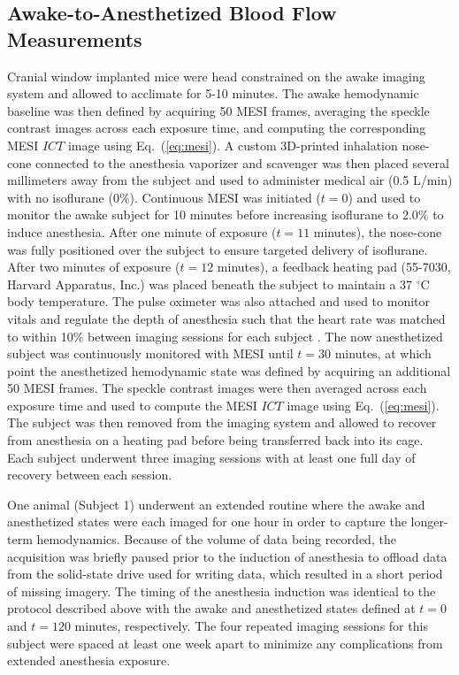 \documentclass[review]{elsarticle}
\begin{document}

\subsection{Awake-to-Anesthetized Blood Flow Measurements}

Cranial window implanted mice were head constrained on the awake imaging system and allowed to acclimate for 5-10 minutes. The awake hemodynamic baseline was then defined by acquiring 50 MESI frames, averaging the speckle contrast images across each exposure time, and computing the corresponding MESI $ICT$ image using Eq.~(\ref{eq:mesi}). A custom 3D-printed inhalation nose-cone connected to the anesthesia vaporizer and scavenger was then placed several millimeters away from the subject and used to administer medical air (0.5 L/min) with no isoflurane (0\%). Continuous MESI was initiated ($t = 0$) and used to monitor the awake subject for 10 minutes before increasing isoflurane to 2.0\% to induce anesthesia. After one minute of exposure ($t = 11$ minutes), the nose-cone was fully positioned over the subject to ensure targeted delivery of isoflurane. After two minutes of exposure ($t = 12$ minutes), a feedback heating pad (55-7030, Harvard Apparatus, Inc.) was placed beneath the subject to maintain a 37 $^\circ$C body temperature. The pulse oximeter was also attached and used to monitor vitals and regulate the depth of anesthesia such that the heart rate was matched to within 10\% between imaging sessions for each subject \cite{Kazmi:2013hp}. The now anesthetized subject was continuously monitored with MESI until $t = 30$ minutes, at which point the anesthetized hemodynamic state was defined by acquiring an additional 50 MESI frames. The speckle contrast images were then averaged across each exposure time and used to compute the MESI $ICT$ image using Eq.~(\ref{eq:mesi}). The subject was then removed from the imaging system and allowed to recover from anesthesia on a heating pad before being transferred back into its cage. Each subject underwent three imaging sessions with at least one full day of recovery between each session.

One animal (Subject 1) underwent an extended routine where the awake and anesthetized states were each imaged for one hour in order to capture the longer-term hemodynamics. Because of the volume of data being recorded, the acquisition was briefly paused prior to the induction of anesthesia to offload data from the solid-state drive used for writing data, which resulted in a short period of missing imagery. The timing of the anesthesia induction was identical to the protocol described above with the awake and anesthetized states defined at $t = 0$ and $t = 120$ minutes, respectively. The four repeated imaging sessions for this subject were spaced at least one week apart to minimize any complications from extended anesthesia exposure.
\end{document}
